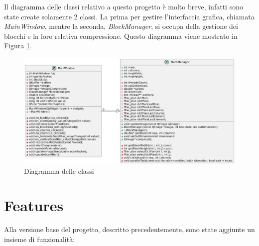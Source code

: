 Il diagramma delle classi relativo a questo progetto è molto breve, infatti sono state create solamente 2 classi. La prima per gestire l'interfaccia grafica, chiamata \textit{MainWindow}, mentre la seconda, \textit{BlockManager}, si occupa della gestione dei blocchi e la loro relativa compressione. Questo diagramma viene mostrato in Figura \ref{fig:class_diagram}.

\begin{figure}[h]
	\centering
	\includegraphics[width=1\linewidth]{figures/class diagram}
	\caption{Diagramma delle classi}
	\label{fig:class_diagram}
\end{figure}

\section{Features}

Alla versione base del progetto, descritto precedentemente, sono state aggiunte un insieme di funzionalità:

